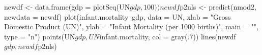 \begin{Schunk}
\begin{Sinput}
 newdf <- data.frame(gdp = plotSeq(UN$gdp, 100))
 newdf$p2nls <- predict(nmod2, newdata = newdf)
 plot(infant.mortality~gdp, data = UN, xlab = "Gross Domestic Product (UN)", ylab = "Infant Mortality (per 1000 births)", main = "", type = "n")
 points(UN$gdp, UN$infant.mortality, col = gray(.7))
 lines(newdf$gdp, newdf$p2nls)
\end{Sinput}
\end{Schunk}
